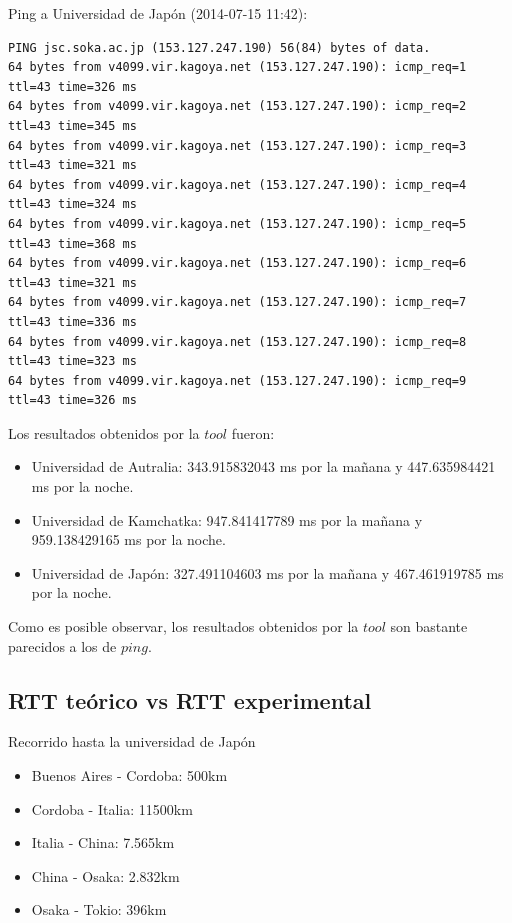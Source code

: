 Ping a Universidad de Japón (2014-07-15 11:42):

\begin{verbatim}
PING jsc.soka.ac.jp (153.127.247.190) 56(84) bytes of data.
64 bytes from v4099.vir.kagoya.net (153.127.247.190): icmp_req=1 ttl=43 time=326 ms
64 bytes from v4099.vir.kagoya.net (153.127.247.190): icmp_req=2 ttl=43 time=345 ms
64 bytes from v4099.vir.kagoya.net (153.127.247.190): icmp_req=3 ttl=43 time=321 ms
64 bytes from v4099.vir.kagoya.net (153.127.247.190): icmp_req=4 ttl=43 time=324 ms
64 bytes from v4099.vir.kagoya.net (153.127.247.190): icmp_req=5 ttl=43 time=368 ms
64 bytes from v4099.vir.kagoya.net (153.127.247.190): icmp_req=6 ttl=43 time=321 ms
64 bytes from v4099.vir.kagoya.net (153.127.247.190): icmp_req=7 ttl=43 time=336 ms
64 bytes from v4099.vir.kagoya.net (153.127.247.190): icmp_req=8 ttl=43 time=323 ms
64 bytes from v4099.vir.kagoya.net (153.127.247.190): icmp_req=9 ttl=43 time=326 ms
\end{verbatim}

Los resultados obtenidos por la $tool$ fueron:

\begin{itemize}
	\item Universidad de Autralia: 343.915832043 ms por la mañana y 447.635984421 ms por la noche.
	\item Universidad de Kamchatka: 947.841417789 ms por la mañana y 959.138429165 ms por la noche.
	\item Universidad de Japón: 327.491104603 ms por la mañana y 467.461919785 ms por la noche.
\end{itemize}

Como es posible observar, los resultados obtenidos por la $tool$ son bastante parecidos a los de $ping$.

\subsection{RTT teórico vs RTT experimental}

Recorrido hasta la universidad de Japón

\begin{itemize}
	\item Buenos Aires - Cordoba: 500km
	\item Cordoba - Italia: 11500km
	\item Italia - China: 7.565km
	\item China - Osaka: 2.832km
	\item Osaka - Tokio: 396km
\end{itemize}

